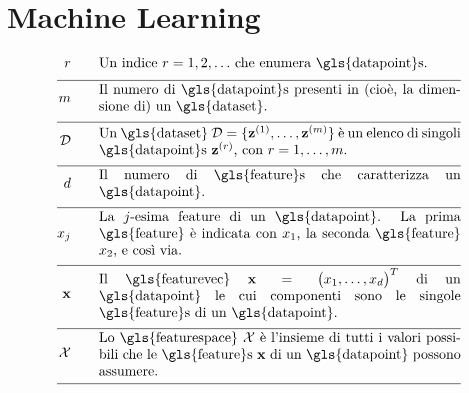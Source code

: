 \newpage
\section*{Machine Learning}

\begin{align}
	\sampleidx \quad\quad & \parbox{.75\textwidth}{Un indice $\sampleidx=1,2,\ldots$ che enumera \gls{datapoint}s.}   \nonumber \\[2mm] \hline \nonumber\\[-5mm]
	\samplesize \quad\quad &\parbox{.75\textwidth}{Il numero di  \gls{datapoint}s presenti in (cioè, la dimensione di) un \gls{dataset}.} \nonumber \\[2mm] \hline \nonumber\\[-5mm] 
	\dataset \quad\quad & \parbox{.75\textwidth}{Un \gls{dataset} $\dataset = \{ \datapoint^{(1)},\ldots, \datapoint^{(\samplesize)} \}$ 
		è un elenco di singoli \gls{datapoint}s $\datapoint^{(\sampleidx)}$, con $\sampleidx=1,\ldots,\samplesize$.}   \nonumber \\[2mm] \hline \nonumber\\[-5mm]
	\featurelen \quad\quad &\parbox{.75\textwidth}{Il numero di \gls{feature}s che caratterizza un \gls{datapoint}.}\nonumber \\[2mm] \hline \nonumber\\[-5mm]
	\feature_{\featureidx} \quad\quad &\parbox{.75\textwidth}{La $\featureidx$-esima feature di un \gls{datapoint}. La prima \gls{feature} 
		è indicata con $\feature_{1}$, la seconda \gls{feature} $\feature_{2}$, e così via. } \nonumber \\[2mm] \hline \nonumber\\[-5mm] 
	\featurevec \quad\quad &\parbox{.75\textwidth}{Il \gls{featurevec} $\featurevec=\big(\feature_{1},\ldots,\feature_{\featuredim}\big)^{T}$ di un \gls{datapoint} le cui componenti sono le singole \gls{feature}s di un \gls{datapoint}.}\nonumber \\[2mm] \hline \nonumber\\[-5mm]
	\featurespace \quad\quad & \parbox{.75\textwidth}{Lo \gls{featurespace} $\featurespace$ è l'insieme di tutti i valori possibili che le \gls{feature}s $\featurevec$ di un \gls{datapoint} possono assumere.} \nonumber \\[2mm] \hline \nonumber\\[-5mm]

\end{align}
